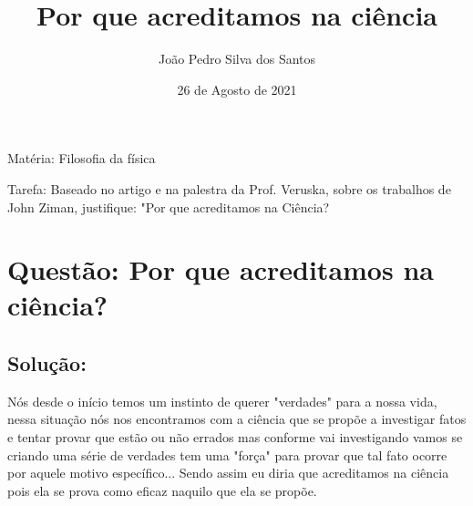 \documentclass{article}
\title{Por que acreditamos na ciência}
\author{João Pedro Silva dos Santos}
\date{26 de Agosto de 2021}
\begin{document}
\maketitle

Matéria: Filosofia da física


Tarefa: Baseado no artigo e na palestra da Prof. Veruska, sobre os trabalhos de John Ziman, justifique: "Por que acreditamos na Ciência?

\section*{Questão: Por que acreditamos na ciência?}
\subsection*{Solução:}

Nós desde o início temos um instinto de querer "verdades" para a nossa vida, nessa situação nós nos encontramos com a ciência que se propõe a investigar fatos e tentar provar que estão ou não errados mas conforme vai investigando vamos se criando uma série de verdades tem uma "força" para provar que tal fato ocorre por aquele motivo específico... Sendo assim eu diria que acreditamos na ciência pois ela se prova como eficaz naquilo que ela se propõe.
\end{document}
